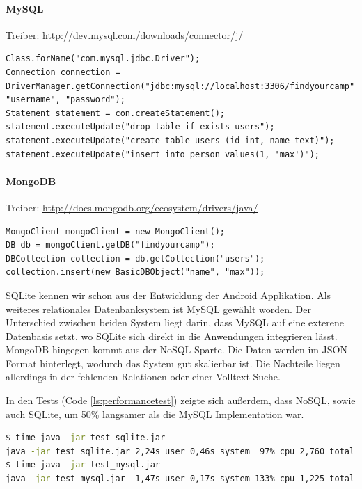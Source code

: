 \paragraph{MySQL}

Treiber: \url{http://dev.mysql.com/downloads/connector/j/}
\begin{lstlisting}[label=ls:mysqlexample,caption=Exemplarische Darstellung der Nutzung des MySQL Treibers]
Class.forName("com.mysql.jdbc.Driver");
Connection connection = DriverManager.getConnection("jdbc:mysql://localhost:3306/findyourcamp", "username", "password");
Statement statement = con.createStatement();
statement.executeUpdate("drop table if exists users");
statement.executeUpdate("create table users (id int, name text)");
statement.executeUpdate("insert into person values(1, 'max')");
\end{lstlisting}

\paragraph{MongoDB}

Treiber: \url{http://docs.mongodb.org/ecosystem/drivers/java/}
\begin{lstlisting}[label=ls:mongoexample,caption=Exemplarische Darstellung der Nutzung des MongoDB Treibers]
MongoClient mongoClient = new MongoClient();
DB db = mongoClient.getDB("findyourcamp");
DBCollection collection = db.getCollection("users");
collection.insert(new BasicDBObject("name", "max"));
\end{lstlisting}

SQLite kennen wir schon aus der Entwicklung der Android Applikation. Als weiteres relationales Datenbanksystem ist MySQL gewählt worden. Der Unterschied zwischen beiden System liegt darin, dass MySQL auf eine exterene Datenbasis setzt, wo SQLite sich direkt in die Anwendungen integrieren lässt. MongoDB hingegen kommt aus der NoSQL Sparte. Die Daten werden im JSON Format hinterlegt, wodurch das System gut skalierbar ist. Die Nachteile liegen allerdings in der fehlenden Relationen oder einer Volltext-Suche.

In den Tests (Code \ref{ls:performancetest}) zeigte sich außerdem, dass NoSQL, sowie auch SQLite, um 50\% langsamer als die MySQL Implementation war.

\begin{lstlisting}[label=ls:performancetest,caption=Perfomancetest zwischen MySQL und SQLite,language=bash]
$ time java -jar test_sqlite.jar
java -jar test_sqlite.jar 2,24s user 0,46s system  97% cpu 2,760 total
$ time java -jar test_mysql.jar
java -jar test_mysql.jar  1,47s user 0,17s system 133% cpu 1,225 total
\end{lstlisting}

